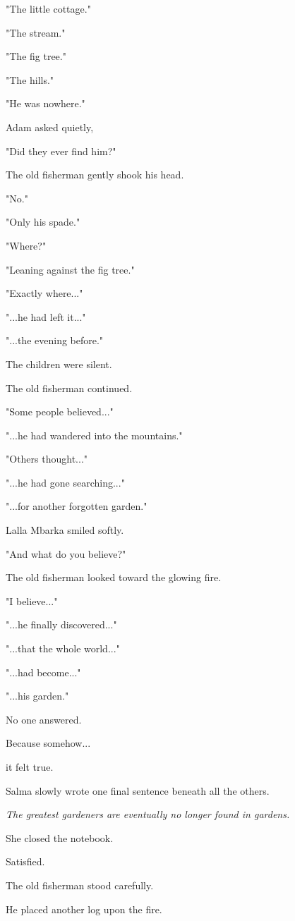 \documentclass[12pt,openany]{book}
\begin{document}
"The little cottage."

"The stream."

"The fig tree."

"The hills."

"He was nowhere."

Adam asked quietly,

"Did they ever find him?"

The old fisherman gently shook his head.

"No."

"Only his spade."

"Where?"

"Leaning against the fig tree."

"Exactly where..."

"...he had left it..."

"...the evening before."

The children were silent.

The old fisherman continued.

"Some people believed..."

"...he had wandered into the mountains."

"Others thought..."

"...he had gone searching..."

"...for another forgotten garden."

Lalla Mbarka smiled softly.

"And what do you believe?"

The old fisherman looked toward the glowing fire.

"I believe..."

"...he finally discovered..."

"...that the whole world..."

"...had become..."

"...his garden."

No one answered.

Because somehow...

it felt true.

Salma slowly wrote one final sentence beneath all the others.

\emph{The greatest gardeners are eventually no longer found in gardens.}

She closed the notebook.

Satisfied.

The old fisherman stood carefully.

He placed another log upon the fire.
\end{document}
